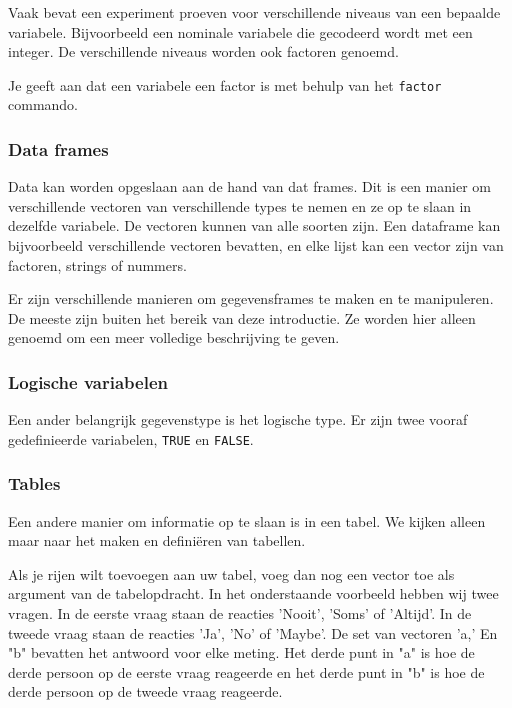 Vaak bevat een experiment proeven voor verschillende niveaus van een bepaalde variabele. Bijvoorbeeld een nominale variabele die gecodeerd wordt met een integer. De verschillende niveaus worden ook factoren genoemd.

Je geeft aan dat een variabele een factor is met behulp van het \texttt{factor} commando. 

\subsubsection{Data frames}

Data kan worden opgeslaan aan de hand van dat frames. Dit is een manier om verschillende vectoren van verschillende types te nemen en ze op te slaan in dezelfde variabele. De vectoren kunnen van alle soorten zijn. Een dataframe kan bijvoorbeeld verschillende vectoren bevatten, en elke lijst kan een vector zijn van factoren, strings of nummers.

Er zijn verschillende manieren om gegevensframes te maken en te manipuleren. De meeste zijn buiten het bereik van deze introductie. Ze worden hier alleen genoemd om een meer volledige beschrijving te geven. 



\subsubsection{Logische variabelen}

Een ander belangrijk gegevenstype is het logische type. Er zijn twee vooraf gedefinieerde variabelen, \texttt{TRUE} en \texttt{FALSE}.

\subsubsection{Tables}

Een andere  manier om informatie op te slaan is in een tabel.  We kijken alleen maar naar het maken en defini\"eren van tabellen. 


Als je rijen wilt toevoegen aan uw tabel, voeg dan nog een vector toe als argument van de tabelopdracht. In het onderstaande voorbeeld hebben wij twee vragen. In de eerste vraag staan de reacties  'Nooit', 'Soms' of 'Altijd'. In de tweede vraag staan de reacties 'Ja', 'No' of 'Maybe'. De set van vectoren 'a,' En "b" bevatten het antwoord voor elke meting. Het derde punt in "a" is hoe de derde persoon op de eerste vraag reageerde en het derde punt in "b" is hoe de derde persoon op de tweede vraag reageerde.

